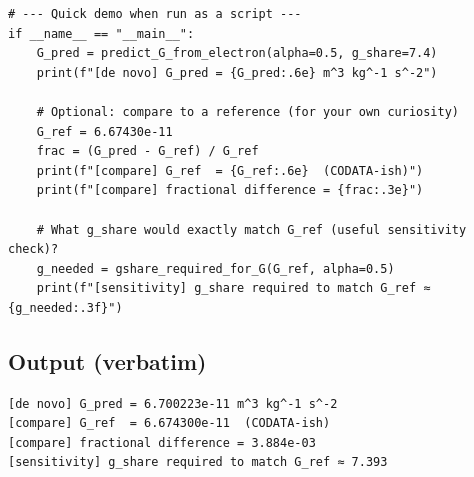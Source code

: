 \documentclass[11pt]{article}
\begin{document}
\begin{verbatim}
# --- Quick demo when run as a script ---
if __name__ == "__main__":
    G_pred = predict_G_from_electron(alpha=0.5, g_share=7.4)
    print(f"[de novo] G_pred = {G_pred:.6e} m^3 kg^-1 s^-2")

    # Optional: compare to a reference (for your own curiosity)
    G_ref = 6.67430e-11
    frac = (G_pred - G_ref) / G_ref
    print(f"[compare] G_ref  = {G_ref:.6e}  (CODATA-ish)")
    print(f"[compare] fractional difference = {frac:.3e}")

    # What g_share would exactly match G_ref (useful sensitivity check)?
    g_needed = gshare_required_for_G(G_ref, alpha=0.5)
    print(f"[sensitivity] g_share required to match G_ref ≈ {g_needed:.3f}")
\end{verbatim}

\subsection*{Output (verbatim)}

\begin{verbatim}
[de novo] G_pred = 6.700223e-11 m^3 kg^-1 s^-2
[compare] G_ref  = 6.674300e-11  (CODATA-ish)
[compare] fractional difference = 3.884e-03
[sensitivity] g_share required to match G_ref ≈ 7.393
\end{verbatim}
\end{document}
